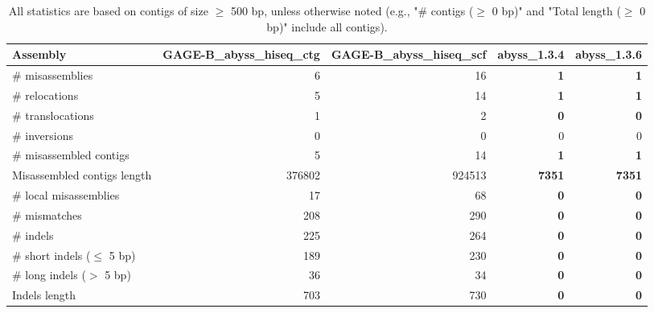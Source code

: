 \documentclass[12pt,a4paper]{article}
\begin{document}
\begin{table}[ht]
\begin{center}
\caption{All statistics are based on contigs of size $\geq$ 500 bp, unless otherwise noted (e.g., "\# contigs ($\geq$ 0 bp)" and "Total length ($\geq$ 0 bp)" include all contigs).}
\begin{tabular}{|l*{4}{|r}|}
\hline
Assembly & GAGE-B\_abyss\_hiseq\_ctg & GAGE-B\_abyss\_hiseq\_scf & abyss\_1.3.4 & abyss\_1.3.6 \\ \hline
\# misassemblies & 6 & 16 & {\bf 1} & {\bf 1} \\ \hline
\hspace{5mm}\# relocations & 5 & 14 & {\bf 1} & {\bf 1} \\ \hline
\hspace{5mm}\# translocations & 1 & 2 & {\bf 0} & {\bf 0} \\ \hline
\hspace{5mm}\# inversions & 0 & 0 & 0 & 0 \\ \hline
\# misassembled contigs & 5 & 14 & {\bf 1} & {\bf 1} \\ \hline
Misassembled contigs length & 376802 & 924513 & {\bf 7351} & {\bf 7351} \\ \hline
\# local misassemblies & 17 & 68 & {\bf 0} & {\bf 0} \\ \hline
\# mismatches & 208 & 290 & {\bf 0} & {\bf 0} \\ \hline
\# indels & 225 & 264 & {\bf 0} & {\bf 0} \\ \hline
\hspace{5mm}\# short indels ($\leq$ 5 bp) & 189 & 230 & {\bf 0} & {\bf 0} \\ \hline
\hspace{5mm}\# long indels ($>$ 5 bp) & 36 & 34 & {\bf 0} & {\bf 0} \\ \hline
Indels length & 703 & 730 & {\bf 0} & {\bf 0} \\ \hline
\end{tabular}
\end{center}
\end{table}
\end{document}
